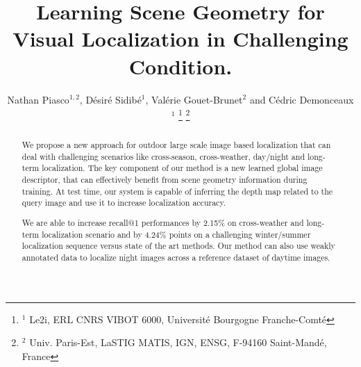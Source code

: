 \documentclass[letterpaper, 10 pt, conference]{ieeeconf}  %
\title{\LARGE \bf
Learning Scene Geometry for \\
Visual Localization in Challenging Condition.
}
\author{Nathan Piasco${}^{1,2}$, D\'esir\'e Sidib\'e${}^1$, Val\'erie Gouet-Brunet${}^2$ and C\'edric Demonceaux${}^1$%
\thanks{${}^1$ Le2i, ERL CNRS VIBOT 6000,  Universit\'e  Bourgogne Franche-Comt\'e}%
\thanks{${}^2$ Univ. Paris-Est, LaSTIG MATIS, IGN, ENSG, F-94160 Saint-Mand\'e, France}%
}
\begin{document}
\newcommand{\norm}[1]{\left\lVert#1\right\rVert}
\newcommand\numberthis{\addtocounter{equation}{1}\tag{\theequation}}

\maketitle
\thispagestyle{empty}
\pagestyle{empty}


\begin{abstract}
We propose a new approach for outdoor large scale image based localization that can deal with challenging scenarios like cross-season, cross-weather, day/night and long-term localization. The key component of our method is a new learned global image descriptor, that can effectively benefit from scene geometry information during training. At test time, our system is capable of inferring the depth map related to the query image and use it to increase localization accuracy.

We are able to increase recall@1 performances by 2.15\% on cross-weather and long-term localization scenario and by 4.24\% points on a challenging winter/summer localization sequence versus state of the art methods. Our method can also use weakly annotated data to localize night images across a reference dataset of daytime images.
\end{abstract}










\end{document}
